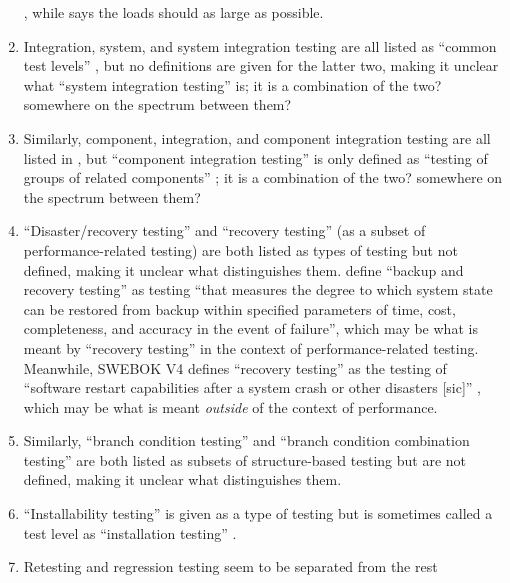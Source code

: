 \begin{enumerate}
            \citep[p.~5]{IEEE2022}, while \citet[p.~86]{Patton2006} says the
            loads should as large as possible.
      \item Integration, system, and system integration testing are all listed
            as ``common test levels'' \citep[p.~12]{IEEE2022}, but no
            definitions are given for the latter two, making it unclear what
            ``system integration testing'' is; it is a combination of the two?
            somewhere on the spectrum between them?
      \item Similarly, component, integration, and component integration
            testing are all listed in \citet{IEEE2017}, but ``component
            integration testing'' is only defined as ``testing of groups of
            related components'' \citep[p.~82]{IEEE2017}; it is a combination of
            the two? somewhere on the spectrum between them?
      \item ``Disaster/recovery testing'' and ``recovery testing'' (as a subset
            of performance-related testing) are both listed as types of testing
            \citep[p.~22]{IEEE2022} but not defined, making it unclear what
            distinguishes them. \citet[p.~2]{IEEE2013} define ``backup and
            recovery testing'' as  testing ``that measures the degree to which
            system state can be restored from backup within specified parameters
            of time, cost, completeness, and accuracy in the event of failure'',
            which may be what is meant by ``recovery
            testing'' in the context of performance-related testing.
            Meanwhile, SWEBOK V4 defines ``recovery testing'' as the testing of
            ``software restart capabilities after a system crash or other
            disasters [sic]'' \citep[p.~5-9]{SWEBOK2024}, which may be what is
            meant \emph{outside} of the context of performance.
      \item Similarly, ``branch condition testing'' and ``branch condition combination
            testing'' are both listed as subsets of structure-based testing
            \citep[p.~22]{IEEE2022} but are not defined, making it unclear what
            distinguishes them.
      \item ``Installability testing'' is given as a type of testing
            \citep[p.~22]{IEEE2022} but is sometimes called a test level as
            ``installation testing'' \citep[p.~445]{PetersAndPedrycz2000}.
      \item Retesting and regression testing seem to be separated from the rest

\end{enumerate}
